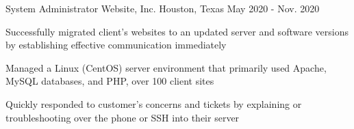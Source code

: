     \begin{cventries}

      \cventry
        {System Administrator} %
        {Website, Inc.} %
        {Houston, Texas} %
        {May 2020 - Nov. 2020} %
        {
          \begin{cvitems}
            \item {Successfully migrated client's websites to an updated server and software versions by establishing effective communication immediately}
            \item {Managed a Linux (CentOS) server environment that primarily used Apache, MySQL databases, and PHP, over 100 client sites}
            \item {Quickly responded to customer's concerns and tickets by explaining or troubleshooting over the phone or SSH into their server}
          \end{cvitems}
        }
  \end{cventries}